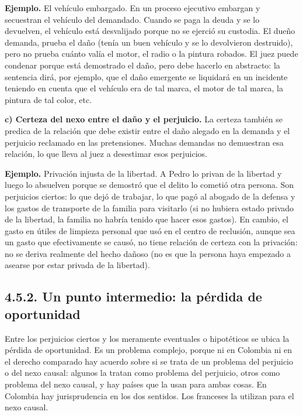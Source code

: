 \begin{ejemplo}
\textcolor[HTML]{4F6228}{\textbf{Ejemplo. }}El vehículo embargado. En un proceso ejecutivo embargan y secuestran el vehículo del demandado. Cuando se paga la deuda y se lo devuelven, el vehículo está desvalijado porque no se ejerció su custodia. El dueño demanda, prueba el daño (tenía un buen vehículo y se lo devolvieron destruido), pero no prueba cuánto valía el motor, el radio o la pintura robados. El juez puede condenar porque está demostrado el daño, pero debe hacerlo en abstracto: la sentencia dirá, por ejemplo, que el daño emergente se liquidará en un incidente teniendo en cuenta que el vehículo era de tal marca, el motor de tal marca, la pintura de tal color, etc.
\end{ejemplo}
\textbf{c) Certeza del nexo entre el daño y el perjuicio.} La certeza también se predica de la relación que debe existir entre el daño alegado en la demanda y el perjuicio reclamado en las pretensiones. Muchas demandas no demuestran esa relación, lo que lleva al juez a desestimar esos perjuicios.

\begin{ejemplo}
\textcolor[HTML]{4F6228}{\textbf{Ejemplo. }}Privación injusta de la libertad. A Pedro lo privan de la libertad y luego lo absuelven porque se demostró que el delito lo cometió otra persona. Son perjuicios ciertos: lo que dejó de trabajar, lo que pagó al abogado de la defensa y los gastos de transporte de la familia para visitarlo (si no hubiera estado privado de la libertad, la familia no habría tenido que hacer esos gastos). En cambio, el gasto en útiles de limpieza personal que usó en el centro de reclusión, aunque sea un gasto que efectivamente se causó, no tiene relación de certeza con la privación: no se deriva realmente del hecho dañoso (no es que la persona haya empezado a asearse por estar privada de la libertad).
\end{ejemplo}
\subsection{4.5.2. Un punto intermedio: la pérdida de oportunidad}
Entre los perjuicios ciertos y los meramente eventuales o hipotéticos se ubica la pérdida de oportunidad. Es un problema complejo, porque ni en Colombia ni en el derecho comparado hay acuerdo sobre si se trata de un problema del perjuicio o del nexo causal: algunos la tratan como problema del perjuicio, otros como problema del nexo causal, y hay países que la usan para ambas cosas. En Colombia hay jurisprudencia en los dos sentidos. Los franceses la utilizan para el nexo causal.

